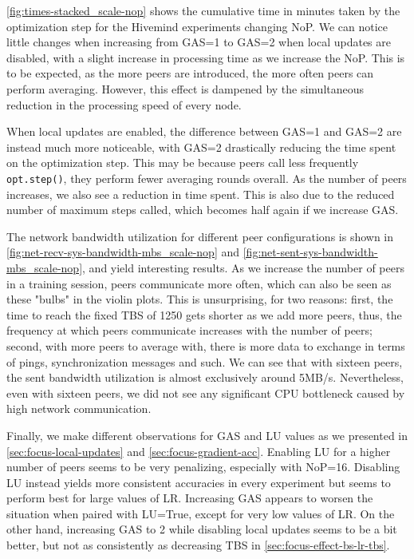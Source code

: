 \autoref{fig:times-stacked_scale-nop} shows the cumulative time in minutes taken by the optimization step for the Hivemind experiments changing NoP.
We can notice little changes when increasing from GAS=1 to GAS=2 when local updates are disabled, with a slight increase in processing time as we increase the NoP.
This is to be expected, as the more peers are introduced, the more often peers can perform averaging.
However, this effect is dampened by the simultaneous reduction in the processing speed of every node.

When local updates are enabled, the difference between GAS=1 and GAS=2 are instead much more noticeable, with GAS=2 drastically reducing the time spent on the optimization step.
This may be because peers call less frequently \texttt{opt.step()}, they perform fewer averaging rounds overall.
As the number of peers increases, we also see a reduction in time spent.
This is also due to the reduced number of maximum steps called, which becomes half again if we increase GAS.

The network bandwidth utilization for different peer configurations is shown in \autoref{fig:net-recv-sys-bandwidth-mbs_scale-nop} and \autoref{fig:net-sent-sys-bandwidth-mbs_scale-nop}, and yield interesting results.
As we increase the number of peers in a training session, peers communicate more often, which can also be seen as these "bulbs" in the violin plots.
This is unsurprising, for two reasons:
first, the time to reach the fixed TBS of 1250 gets shorter as we add more peers, thus, the frequency at which peers communicate increases with the number of peers;
second, with more peers to average with, there is more data to exchange in terms of pings, synchronization messages and such.
We can see that with sixteen peers, the sent bandwidth utilization is almost exclusively around 5MB/s.
Nevertheless, even with sixteen peers, we did not see any significant CPU bottleneck caused by high network communication.

Finally, we make different observations for GAS and LU values as we presented in \autoref{sec:focus-local-updates} and \autoref{sec:focus-gradient-acc}.
Enabling LU for a higher number of peers seems to be very penalizing, especially with NoP=16.
Disabling LU instead yields more consistent accuracies in every experiment but seems to perform best for large values of LR.
Increasing GAS appears to worsen the situation when paired with LU=True, except for very low values of LR.
On the other hand, increasing GAS to 2 while disabling local updates seems to be a bit better, but not as consistently as decreasing TBS in \autoref{sec:focus-effect-bs-lr-tbs}.

